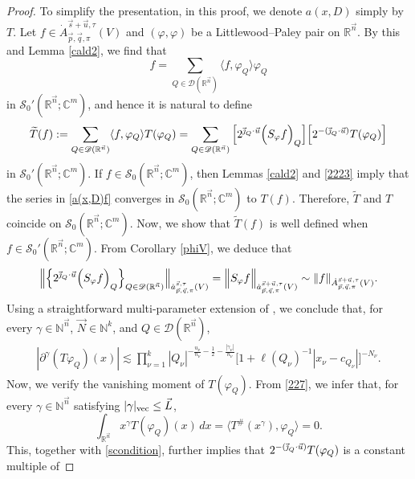 \documentclass[11pt, reqno]{amsart}
\theoremstyle{definition}
\theoremstyle{remark}
\numberwithin{equation}{section}
\newcommand{\C}{\mathbb C}
\newcommand{\N}{\mathbb N}
\newcommand{\R}{\mathbb R}
\newcommand{\vj}{\vec{\textit{\j}}}
\newcommand{\vn}{\vec n}
\newcommand{\vp}{\vec p}
\newcommand{\vq}{\vec q}
\newcommand{\vs}{\vec s}
\newcommand{\vu}{\vec u}
\newcommand{\abs}[1]{|#1|}
\begin{document}
\begin{proof}
To simplify the presentation,
in this proof, we denote $a(x,D)$ simply by $T$.
Let $f\in\dot A_{\vp,\vq,\pi}^{\vs+\vu,\tau}(V)$
and $(\varphi,\varphi)$ be a Littlewood--Paley pair on $\R^{\vn}$.
By this and Lemma \ref{cald2}, we find that
$$
f=\sum_{Q\in\mathscr D(\R^{\vn})}
\langle f,\varphi_Q\rangle\varphi_Q
$$
in $\mathscr{S}_0'(\R^{\vn};\C^m)$, and hence it is natural to define
\begin{equation}\label{a(x,D)f}
\widetilde T(f)
:=\sum_{Q\in\mathscr{D}(\mathbb R^{\vec n})}
\langle f,\varphi_Q\rangle T(\varphi_Q)
=\sum_{Q\in\mathscr{D}(\mathbb R^{\vec n})}
\Big[2^{\vj_Q \cdot \vu} \Big(S_\varphi f\Big)_Q\Big]
\Big[2^{-(\vj_Q \cdot \vu)} T(\varphi_Q)\Big]
\end{equation}
in $\mathscr{S}_0'(\R^{\vn};\C^m)$.
If $f\in\mathscr S_0(\R^{\vn};\C^m)$,
then Lemmas \ref{cald2} and \ref{2223} imply that
the series in \eqref{a(x,D)f} converges in $\mathscr S_0(\R^{\vn};\C^m)$ to $T(f)$.
Therefore, $\widetilde T$ and $T$ coincide on $\mathscr S_0(\R^{\vn};\C^m)$.
Now, we show that $\widetilde T(f)$ is well defined when $f\in\mathscr{S}_0'(\R^{\vn};\C^m)$.
From Corollary \ref{phiV}, we deduce that
\begin{equation}\label{102}
\Big\|\Big\{ 2^{\vj_Q \cdot \vu}
\Big(S_\varphi f\Big)_Q
\Big\}_{Q\in\mathscr{D}(\mathbb R^{\vec n})}\Big\|_{\dot a_{\vp,\vq,\pi}^{\vs,\tau}(V)}
=\Big\|S_\varphi f\Big\|_{\dot a_{\vp,\vq,\pi}^{\vs+\vu,\tau}(V)}
\sim \|f\|_{\dot A_{\vp,\vq,\pi}^{\vs+\vu,\tau}(V)}.
\end{equation}
Using a straightforward multi-parameter extension of \cite[pp.\,265--266]{GT99},
we conclude that,
for every $\gamma\in\mathbb N^{\vn}$, $\vec N\in\mathbb N^k$, and $Q\in\mathscr{D}(\R^{\vn})$,
\begin{align}\label{scondition}
\abs{\partial^{\gamma}(T\varphi_Q)(x)}\lesssim\prod_{\nu=1}^{k}|Q_\nu|^{-\frac{u_\nu}{n_\nu}
-\frac12-\frac{|\gamma_\nu|}{n_\nu}}\Big[1+\ell(Q_\nu)^{-1}
|x_\nu-c_{Q_\nu}|\Big]^{-N_\nu}.
\end{align}
Now, we verify the vanishing moment of $T(\varphi_Q)$.
From \eqref{227}, we infer that, for every $\gamma\in\N^{\vn}$
satisfying $|\gamma|_{\rm{vec}}\leq \vec L$,
\begin{equation*}
\int_{\mathbb R^{\vec n}}x^{\gamma}
T(\varphi_Q)(x)\,dx
=\Big\langle
T^{\#}(x^{\gamma}),
\varphi_Q \Big\rangle
=0.
\end{equation*}
This, together with \eqref{scondition}, further implies that
$2^{-(\vj_Q \cdot \vu)}T(\varphi_Q)$ is a constant multiple of

\end{proof}
\end{document}
